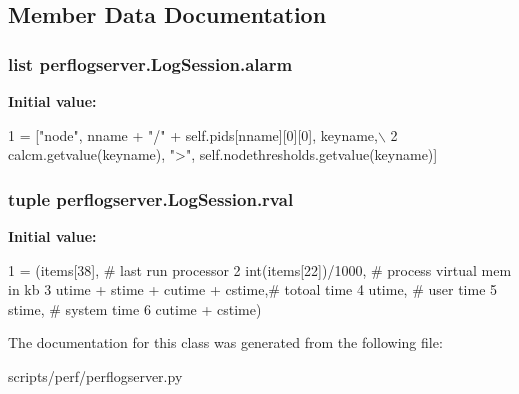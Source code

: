\subsection{Member Data Documentation}
\hypertarget{classperflogserver_1_1_log_session_a29d16f74a62f55e8e357657fcf0b493d}{
\subsubsection[{alarm}]{\setlength{\rightskip}{0pt plus 5cm}list perflogserver.\+Log\+Session.\+alarm\hspace{0.3cm}{\ttfamily [static]}}}\label{classperflogserver_1_1_log_session_a29d16f74a62f55e8e357657fcf0b493d}
{\bfseries Initial value\+:}
\begin{DoxyCode}
1 = [\textcolor{stringliteral}{"node"}, nname + \textcolor{stringliteral}{"/"} + self.pids[nname][0][0], keyname,\(\backslash\)
2                       calcm.getvalue(keyname), \textcolor{stringliteral}{">"}, self.nodethresholds.getvalue(keyname)]
\end{DoxyCode}
\hypertarget{classperflogserver_1_1_log_session_a7b6a159f40f85c8adda09c9f9fc441c1}{
\subsubsection[{rval}]{\setlength{\rightskip}{0pt plus 5cm}tuple perflogserver.\+Log\+Session.\+rval\hspace{0.3cm}{\ttfamily [static]}}}\label{classperflogserver_1_1_log_session_a7b6a159f40f85c8adda09c9f9fc441c1}
{\bfseries Initial value\+:}
\begin{DoxyCode}
1 = (items[38],       \textcolor{comment}{# last run processor}
2             int(items[22])/1000,        \textcolor{comment}{# process virtual mem in kb}
3                 utime + stime + cutime + cstime,\textcolor{comment}{# totoal time}
4                 utime,                  \textcolor{comment}{# user time}
5                 stime,                  \textcolor{comment}{# system time}
6                 cutime + cstime)
\end{DoxyCode}


The documentation for this class was generated from the following file\+:\begin{DoxyCompactItemize}
\item 
scripts/perf/perflogserver.\+py\end{DoxyCompactItemize}

